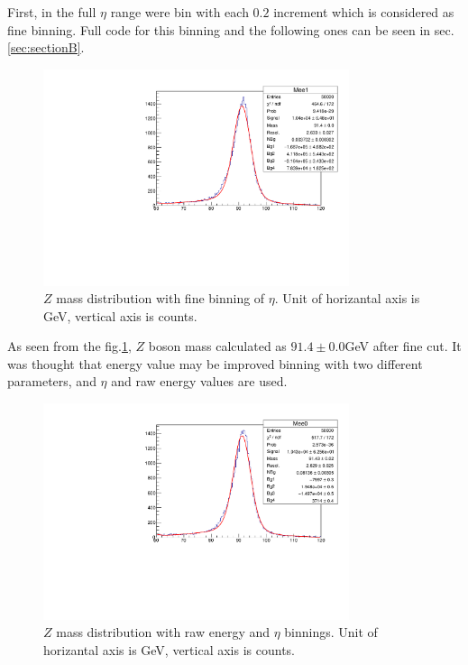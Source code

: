 First, in the full $\eta$ range were bin with each $0.2$ increment which is considered as fine binning. Full code for this binning and the following ones can be seen in sec.\ref{sec:sectionB}.
\begin{figure}[h]
    \centering
	\includegraphics[width=0.8\textwidth]{../figures/full_eta_cuts.pdf}
	\caption{$Z$ mass distribution with fine binning of $\eta$. Unit of horizantal axis is GeV, vertical axis is counts.}
    \label{fig:full_eta_cuts}
\end{figure}
\FloatBarrier
As seen from the fig.\ref{fig:full_eta_cuts}, $Z$ boson mass calculated as $ 91.4 \pm 0.0 $GeV after fine cut. It was thought that energy value may be improved binning with two different parameters, and $\eta$ and raw energy values are used.
\begin{figure}[h]
    \centering
	\includegraphics[width=0.8\textwidth]{../figures/energy_and_eta_cuts.pdf}
	\caption{$Z$ mass distribution with raw energy and $\eta$ binnings. Unit of horizantal axis is GeV, vertical axis is counts.}
    \label{fig:energy_and_eta_cuts}
\end{figure}
\FloatBarrier
